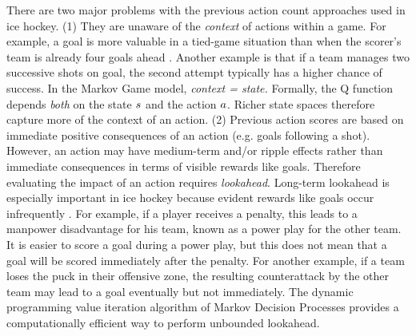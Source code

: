 \documentclass[]{article}
\begin{document}
There are two major problems with the previous action count approaches used in ice hockey. (1) They are unaware of the {\em context} of actions within a game. For example, a goal is more valuable in a tied-game situation than when the scorer's team is already four goals ahead \citep{Pettigrew2015}. Another example is that if a team manages two successive shots on goal, the second attempt typically has a higher chance of success. In the Markov Game model, \emph{context  = state.}
Formally, the Q function depends {\em both} on the state $s$ and the action $a$. Richer state spaces therefore capture more of the context of an action. (2) Previous action scores are based on immediate positive consequences of an action (e.g. goals following a shot). However, an action may have medium-term and/or ripple effects rather than immediate consequences in terms of visible rewards like goals. Therefore evaluating the impact of an action requires {\em lookahead}.  Long-term lookahead is especially important in ice hockey because evident rewards like goals occur infrequently \citep{Lock2009}. For example, if a player receives a penalty, this leads to a manpower disadvantage for his team, known as a power play for the other team. It is easier to score a goal during a power play, but this does not mean that a goal will be scored immediately after the penalty. For another example, if a team loses the puck in their offensive zone, the resulting counterattack by the other team may lead to a goal eventually but not immediately. The dynamic programming value iteration algorithm of Markov Decision Processes provides a computationally efficient way to perform unbounded lookahead.


\end{document}
